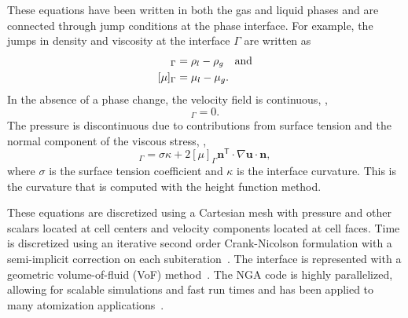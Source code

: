 These equations have been written in both the gas and liquid phases and are connected through jump conditions at the phase interface.
For example, the jumps in density and viscosity at the interface
$\Gamma$ are written as 
\begin{align}
[\rho]_\Gamma&%
=\rho_l-\rho_g \label{eqn:rho}\mbox{\quad and}\\
[\mu]_\Gamma&%
=\mu_l-\mu_g.
\label{eqn:mu}
\end{align}
In the absence of a phase change, the velocity field is continuous, \ie,
\begin{equation}
[\bm{u}]_\Gamma=0.
\end{equation}
The pressure is discontinuous due to contributions from surface tension and the normal component of the viscous stress, \ie,
\begin{equation}
[p]_\Gamma=\sigma\kappa+ 2\left[\mu\right]_\Gamma\bm{n}^\mathsf{T}\cdot\nabla\bm{u}\cdot\bm{n},
\end{equation}
where
$\sigma$ is the surface tension coefficient and
$\kappa$ is the interface curvature. This is the curvature that is computed with the height function method.

These equations are discretized using a Cartesian mesh with pressure and other scalars located at cell centers and velocity components located at cell faces. Time is discretized using an iterative second order Crank-Nicolson formulation with a semi-implicit correction on each subiteration~\cite{choi}. The interface is represented with a geometric volume-of-fluid (VoF) method~\cite{Owkes2017,Owkes2014}. The NGA code is highly parallelized, allowing for scalable simulations and fast run times and has been applied to many atomization applications~\cite{OwkesAIAA,Desjardins2013,sheehy}.

